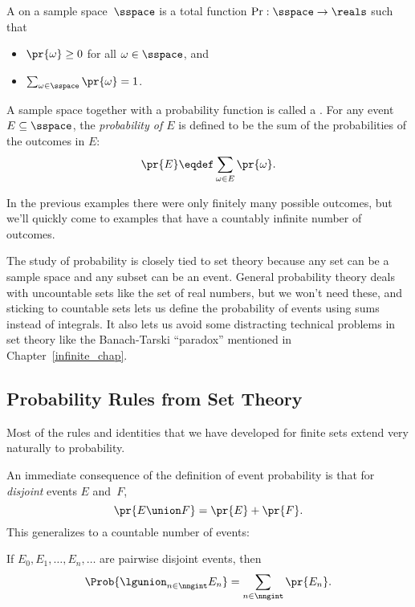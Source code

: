 \begin{definition}\label{LN12:probsp}
 A  on a sample space~$\sspace$ is a total
 function $\operatorname{Pr}: \sspace\to \reals$ such that
\begin{itemize}
\item $\pr{\omega} \geq 0$ for all $\omega \in \sspace$, and
\item $\sum_{\omega \in \sspace} \pr{\omega} = 1$.
\end{itemize}
A sample space together with a probability function is called a
.
For any event $E \subseteq \sspace$, the 
\emph{probability of $E$} is defined to be the sum of the probabilities of
the outcomes in $E$:
\[
    \pr{E} \eqdef \sum_{\omega \in E} \pr{\omega}.
\]
\end{definition}

In the previous examples there were only finitely many possible
outcomes, but we'll quickly come to examples that have a countably
infinite number of outcomes.

The study of probability is closely tied to set theory
because any set can be a sample space and any subset can be an event.
General probability theory deals with uncountable sets like the set of
real numbers, but we won't need these, and sticking to countable
sets lets us define the probability of events using sums instead of
integrals.  It also lets us avoid some distracting technical problems
in set theory like the Banach-Tarski ``paradox'' mentioned in
Chapter~\ref{infinite_chap}.

\subsection{Probability Rules from Set Theory}\label{sec:union_bound}

Most of the rules and identities that we have developed for finite
sets extend very naturally to probability.  

\iffalse We'll cover several examples in this section, but first let's
review some definitions that should already be familiar.\fi

An immediate consequence of the definition of event probability is
that for \emph{disjoint} events $E$ and~$F$,
\[
    \pr{E \union F} = \pr{E} + \pr{F}.
\]
This generalizes to a countable number of events:
\begin{rul}
  If $E_0,E_1,\dots,E_n,\dots$ are pairwise disjoint events, then
\[
    \Prob{\lgunion_{n\in\nngint}E_n} = \sum_{n\in\nngint} \pr{E_n}.
\]
\end{rul}

